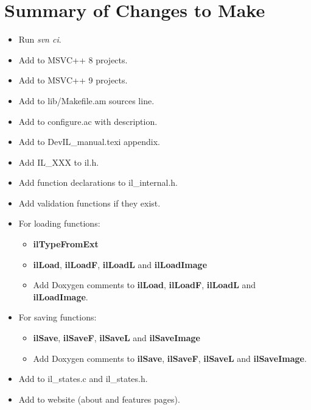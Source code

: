 \documentclass[letterpaper,10pt]{article}
\begin{document}
\section*{Summary of Changes to Make}
\begin{itemize}
\item Run \emph{svn ci}.
\item Add to MSVC++ 8 projects.
\item Add to MSVC++ 9 projects.
\item Add to lib/Makefile.am sources line.
\item Add to configure.ac with description.
\item Add to DevIL_manual.texi appendix.
\item Add IL\_XXX to il.h.
\item Add function declarations to il\_internal.h.
\item Add validation functions if they exist.
\item For loading functions:
	\begin {itemize}
		\item \textbf{ilTypeFromExt}
		\item \textbf{ilLoad}, \textbf{ilLoadF}, \textbf{ilLoadL} and \textbf{ilLoadImage}
		\item Add Doxygen comments to \textbf{ilLoad}, \textbf{ilLoadF}, \textbf{ilLoadL} and \textbf{ilLoadImage}.
	\end {itemize}
\item For saving functions:
	\begin {itemize}
		\item \textbf{ilSave}, \textbf{ilSaveF}, \textbf{ilSaveL} and \textbf{ilSaveImage}
		\item Add Doxygen comments to \textbf{ilSave}, \textbf{ilSaveF}, \textbf{ilSaveL} and \textbf{ilSaveImage}.
	\end {itemize}
\item Add to il\_states.c and il\_states.h.
\item Add to website (about and features pages).
\end{itemize}
\end{document}
